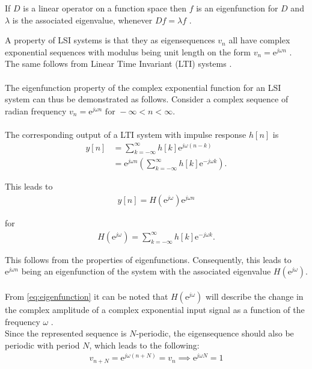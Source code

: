 \begin{definition}[Eigenfunction]
If $D$ is a linear operator on a function space then $f$ is an eigenfunction for $D$ and $\lambda$ is the associated eigenvalue, whenever $Df = \lambda f$ \cite{Eigenfunctions}.
\end{definition}

A property of LSI systems is that they as eigensequences $v_n$ all have complex exponential sequences with modulus being unit length on the form $v_n = \text{e}^{j \omega n}$ \cite{FSP}.\\ The same follows from Linear Time Invariant (LTI) systems \cite{DTSP}.
\\\\
The eigenfunction property of the complex exponential function for an LSI system can thus be demonstrated as follows. Consider a complex sequence of radian frequency $v_n = \text{e}^{j\omega n} \text{ for } -\infty < n < \infty$.
\\\\
The corresponding output of a LTI system with impulse response $h[n]$ is
\begin{align*}
y[n] 
&= \sum_{k=-\infty}^{\infty} h[k]\text{e}^{j\omega(n-k)} \nonumber \\ 
&= \text{e}^{j\omega n} \left(\sum_{k=-\infty}^{\infty} h[k]\text{e}^{-j\omega k} \right).
\end{align*}

This leads to
\begin{align}\label{eq:eigenfunction}
y[n] = H(\text{e}^{j \omega}) \text{e}^{j\omega n}
\end{align}

for
\begin{align*}
H(\text{e}^{j\omega}) = \sum_{k=-\infty}^{\infty} h[k]\text{e}^{-j\omega k}.
\end{align*}

This follows from the properties of eigenfunctions. Consequently, this leads to $\text{e}^{j\omega n}$ being an eigenfunction of the system with the associated eigenvalue $H(\text{e}^{j\omega})$.
\\\\
From \eqref{eq:eigenfunction} it can be noted that $H(\text{e}^{j\omega})$ will describe the change in the complex amplitude of a complex exponential input signal as a function of the frequency $\omega$ \cite{DTSP}. 
\\
Since the represented sequence is $N$-periodic, the eigensequence should also be periodic with period $N$, which leads to the following:
\begin{align*}
v_{n+N} = \text{e}^{j\omega (n+N)} = v_n \implies \text{e}^{j\omega N} = 1
\end{align*}

